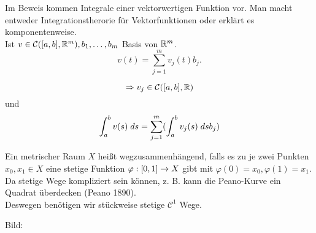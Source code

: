 \documentclass[../ana2.tex]{subfiles}
\begin{document}
\begin{bem}
    Im Beweis kommen Integrale einer vektorwertigen Funktion
    vor. Man macht entweder Integrationstherorie für Vektorfunktionen
    oder erklärt es komponentenweise.\\
    Ist \( v \in \mathcal{C}([a,b], \R^m), 
    b_1, \ldots, b_m \) Basis von \( \R^m \).
    \[ v(t) = \sum_{j=1}^m v_j(t) b_j. \]

    \[ \Rightarrow v_j \in \mathcal{C}([a,b], \R) \]
    und
    \[ \integralx{v(s)}{a}{b}{s} 
    = \sum_{j=1}^m (\integralx{v_j(s)}{a}{b}{s}b_j) \]
\end{bem}
\begin{defi}
    Ein metrischer Raum \(X\) heißt wegzusammenhängend, falls 
    es zu je zwei Punkten \( x_0, x_1 \in X \) eine stetige 
    Funktion \( \abb{\varphi}{[0,1]}{X} \) gibt mit 
    \( \varphi(0) = x_0, \varphi(1) = x_1 \).\\
    Da stetige Wege kompliziert sein können, z. B. 
    kann die Peano-Kurve ein Quadrat überdecken (Peano 1890).\\
    Deswegen benötigen wir stückweise stetige \( \mathcal{C}^1 \) 
    Wege.
\end{defi}
Bild: 
\end{document}
